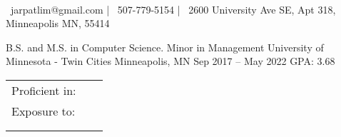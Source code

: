 \documentclass[]{awesome-cv}
\begin{document}
    
\begin{center}
	  \\
	\vspace{2mm}
	{\faEnvelope\ jarpatlim@gmail.com} | {\faMobile\ 507-779-5154} | {\faMapMarker\ 2600 University Ave SE, Apt 318, Minneapolis MN, 55414}
\end{center}
\begin{cventries}
	\cventry
	{B.S. and M.S. in Computer Science. Minor in Management}
	{University of Minnesota - Twin Cities}
	{Minneapolis, MN}
	{Sep 2017 – May 2022}
	{GPA: 3.68}
\end{cventries}

\vspace{-2mm}
\begin{cventries}
	\vspace{-3mm}
	\cventry
	{}
	{\def\arraystretch{1.50}{\begin{tabular}{ l l }
	    Proficient in: \  & {\skill{Python, Java, C++, C, Git}} \\
		Exposure to:  & {\skill{Django, Spring Boot, AWS, Kubernetes, Docker, Drone, Gitlab, Jira, Azure DevOps, Oracle, Ansible, }} \\
		& {\skill{Vue.js, ReactJS, Node.js, .NET Core, Groovy, Kotlin, Spock, Flask, Click, OCaml, Unix Programming,}}\\
		& {\skill{SQL, TypeScript/JavaScript, HTML/CSS, JUnit}}\\
		\end{tabular}}}
	{}
	{}
	{}
\end{cventries}
\end{document}
